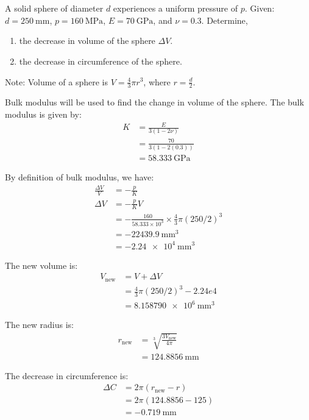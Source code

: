 \section{}
A solid sphere of diameter $d$ experiences a uniform pressure of $p$. Given: $d = \qty{250}{\milli\meter}$, 
$p = \qty{160}{\mega\pascal}$, $E = \qty{70}{\giga\pascal}$, and $\nu = 0.3$. Determine,

\begin{enumerate}[label=(\alph*)]
    \item the decrease in volume of the sphere $\Delta V$.
    \item the decrease in circumference of the sphere.
\end{enumerate}

Note: Volume of a sphere is $V = \frac{4}{3}\pi r^3$, where $r = \frac{d}{2}$.


Bulk modulus will be used to find the change in volume of the sphere. The bulk modulus is given by:
\begin{align*}
    K &= \frac{E}{3(1-2\nu)} \\
    &= \frac{70}{3(1-2(0.3))} \\
    &= \qty{58.333}{\giga\pascal}
\end{align*}

By definition of bulk modulus, we have:
\begin{align*}
    \frac{\Delta V}{V} &= -\frac{p}{K} \\
    \Delta V &= -\frac{p}{K}V \\
    &= -\frac{160}{58.333\times 10^3} \times \frac{4}{3}\pi (250/2)^3 \\
    &= -\qty{22439.9}{\milli\meter^3} \\
    &= \boxed{\qty{-2.24e4}{\milli\meter^3}}
\end{align*}

The new volume is:
\begin{align*}
    V_{\text{new}} &= V + \Delta V \\
    &= \frac{4}{3}\pi (250/2)^3 - 2.24e4 \\
    &= \boxed{\qty{8.158790e6}{\milli\meter^3}}
\end{align*}

The new radius is:
\begin{align*}
    r_{\text{new}} &= \sqrt[3]{\frac{3V_{\text{new}}}{4\pi}} \\
    &= \boxed{\qty{124.8856}{\milli\meter}}
\end{align*}

The decrease in circumference is:
\begin{align*}
    \Delta C &= 2\pi(r_{\text{new}} - r) \\
    &= 2\pi(124.8856 - 125) \\
    &= \boxed{\qty{-0.719}{\milli\meter}}
\end{align*}



